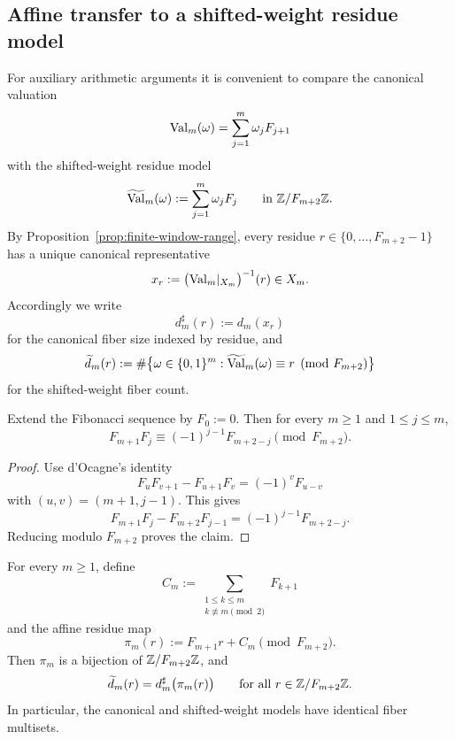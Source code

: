 \subsection{Affine transfer to a shifted-weight residue model}\label{sec:stab:transfer}

For auxiliary arithmetic arguments it is convenient to compare the canonical valuation
\[
\mathrm{Val}_m(\omega)=\sum_{j=1}^m \omega_j F_{j+1}
\]
with the shifted-weight residue model
\[
\widetilde{\mathrm{Val}}_m(\omega):=\sum_{j=1}^m \omega_j F_j
\qquad\text{in }\mathbb{Z}/F_{m+2}\mathbb{Z}.
\]
By Proposition~\ref{prop:finite-window-range}, every residue $r\in\{0,\dots,F_{m+2}-1\}$ has a unique canonical representative
\[
x_r:=\bigl(\mathrm{Val}_m|_{X_m}\bigr)^{-1}(r)\in X_m.
\]
Accordingly we write
\[
d_m^\sharp(r):=d_m(x_r)
\]
for the canonical fiber size indexed by residue, and
\[
\widetilde d_m(r):=\#\bigl\{\omega\in\{0,1\}^m:\widetilde{\mathrm{Val}}_m(\omega)\equiv r \pmod{F_{m+2}}\bigr\}
\]
for the shifted-weight fiber count.

\begin{lemma}\label{lem:cross-multiplication}
Extend the Fibonacci sequence by $F_0:=0$. Then for every $m\ge 1$ and $1\le j\le m$,
\[
F_{m+1}F_j \equiv (-1)^{j-1}F_{m+2-j}\pmod{F_{m+2}}.
\]
\end{lemma}

\begin{proof}
Use d'Ocagne's identity
\[
F_uF_{v+1}-F_{u+1}F_v = (-1)^vF_{u-v}
\]
with $(u,v)=(m+1,j-1)$. This gives
\[
F_{m+1}F_j-F_{m+2}F_{j-1}=(-1)^{j-1}F_{m+2-j}.
\]
Reducing modulo $F_{m+2}$ proves the claim.
\end{proof}

\begin{theorem}\label{thm:affine-transfer}
For every $m\ge 1$, define
\[
C_m:=\sum_{\substack{1\le k\le m\\k\not\equiv m\!\!\!\pmod 2}} F_{k+1}
\]
and the affine residue map
\[
\pi_m(r):=F_{m+1}r+C_m \pmod{F_{m+2}}.
\]
Then $\pi_m$ is a bijection of $\mathbb{Z}/F_{m+2}\mathbb{Z}$, and
\[
\widetilde d_m(r)=d_m^\sharp\bigl(\pi_m(r)\bigr)\qquad\text{for all }r\in\mathbb{Z}/F_{m+2}\mathbb{Z}.
\]
In particular, the canonical and shifted-weight models have identical fiber multisets.
\end{theorem}

